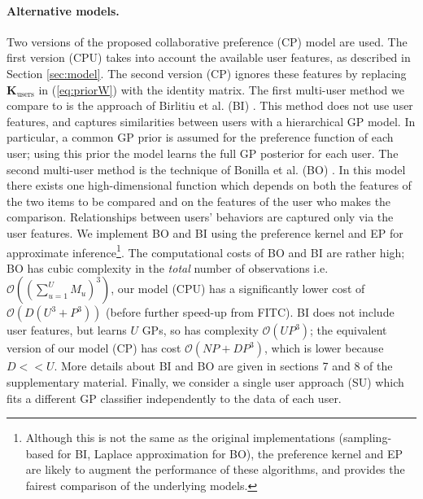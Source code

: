 \paragraph{Alternative models.} Two versions of the proposed collaborative preference (CP) model are used.
The first version (CPU) takes into account the available user features, as described in Section \ref{sec:model}. The second version (CP) ignores these features by
replacing $\mathbf{K}_\text{users}$ in (\ref{eq:priorW}) with the identity matrix.
The first multi-user method we compare to is the approach of Birlitiu et al. (BI) \cite{birlutiu2009}.
This method does not use user features, and captures similarities between users with a hierarchical GP model. In particular,
a common GP prior is assumed for the preference function of each user; using this prior the model learns 
the full GP posterior for each user.
The second multi-user method is the technique of Bonilla et al. (BO) \cite{Bonilla2010}.
In this model there exists one high-dimensional function which depends on both
the features of the two items to be compared and on the features of the user who makes the comparison. Relationships between users' behaviors are captured only via the user features.
We implement BO and BI using the preference kernel and EP for approximate inference\footnote{Although
this is not the same as the original implementations (sampling-based for BI, Laplace approximation for BO), 
the preference kernel and EP are likely to augment the performance of these algorithms, 
and provides the fairest comparison of the underlying models.}.
The computational costs of BO and BI are rather high; BO has cubic complexity in the \emph{total} number of observations i.e. $\mathcal{O}((\sum_{u=1}^UM_u)^3)$, 
our model (CPU) has a significantly lower cost of $\mathcal{O}(D(U^3+P^3))$ (before further speed-up from FITC). 
BI does not include 
user features, but learns $U$ GPs, so has complexity $\mathcal{O}(UP^3)$; the equivalent version of our model
(CP) has cost $\mathcal{O}(NP+DP^3)$, which is lower because $D<<U$.
More details about BI and BO are given in sections 7 and 8 of the supplementary material.
Finally, we consider a single user approach (SU) which fits a different GP classifier independently to the data of each user.

